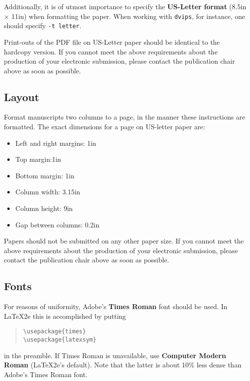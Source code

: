 \documentclass[11pt]{article}
\begin{document}
Additionally, it is of utmost importance to specify the {\bf US-Letter format} (8.5in $\times$ 11in) when formatting the paper. When working with {\tt dvips}, for instance, one should specify {\tt -t letter}.

Print-outs of the PDF file on US-Letter paper should be identical to the
hardcopy version.  If you cannot meet the above requirements about the
production of your electronic submission, please contact the
publication chair above as soon as possible.


\subsection{Layout}
\label{ssec:layout}

Format manuscripts two columns to a page, in the manner these
instructions are formatted. The exact dimensions for a page on US-letter
paper are:

\begin{itemize}
\item Left and right margins: 1in
\item Top margin:1in
\item Bottom margin: 1in
\item Column width: 3.15in
\item Column height: 9in
\item Gap between columns: 0.2in
\end{itemize}

\noindent Papers should not be submitted on any other paper size. If you cannot meet the above requirements about the production of your electronic submission, please contact the publication chair above as soon as possible.

\subsection{Fonts}

For reasons of uniformity, Adobe's {\bf Times Roman} font should be
used. In \LaTeX2e{} this is accomplished by putting

\begin{quote}
\begin{verbatim}
\usepackage{times}
\usepackage{latexsym}
\end{verbatim}
\end{quote}
in the preamble. If Times Roman is unavailable, use {\bf Computer
  Modern Roman} (\LaTeX2e{}'s default).  Note that the latter is about
  10\% less dense than Adobe's Times Roman font.
\end{document}
